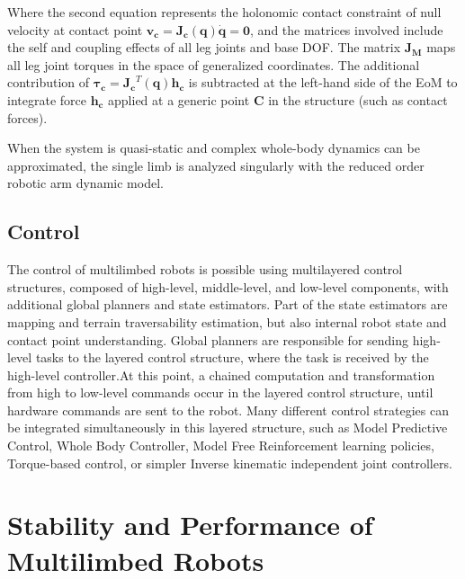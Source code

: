 \documentclass[11pt,a4paper,twocolumn]{article}
\begin{document}
Where the second equation represents the holonomic contact constraint of null velocity at contact point $\mathbf{v_c} = \mathbf{J_c}(\mathbf{q})\mathbf{\dot{q}} = \mathbf{0}$, and 
the matrices involved include the self and coupling effects of all leg joints and base DOF. The matrix $\mathbf{J_M}$ maps all leg joint torques in the space of generalized coordinates. The additional contribution of $\mathbf{\tau_c} = \mathbf{J_c}^T(\mathbf{q})\mathbf{h_c}$ is subtracted at the left-hand side of the EoM to integrate force $\mathbf{h_c}$ applied at a generic point $\mathbf{C}$ in the structure (such as contact forces).

When the system is quasi-static and complex whole-body dynamics can be approximated, the single limb is analyzed singularly with the reduced order robotic arm dynamic model\cite{Siciliano}. 

\subsection{Control}
\label{subsec:control}

The control of multilimbed robots is possible using multilayered control structures, composed of high-level, middle-level, and low-level components, with additional global planners and state estimators. 
Part of the state estimators are mapping and terrain traversability estimation, but also internal robot state and contact point understanding. Global planners are responsible for sending high-level tasks to the layered control structure, where the task is received by the high-level controller.At this point, a chained computation and transformation from high to low-level commands occur in the layered control structure, until hardware commands are sent to the robot. Many different control strategies can be integrated simultaneously in this layered structure, such as Model Predictive Control, Whole Body Controller, Model Free Reinforcement learning policies, Torque-based control, or simpler Inverse kinematic independent joint controllers. 


\section{Stability and Performance of Multilimbed Robots}
\label{sec:multilimb_performance}
\end{document}
